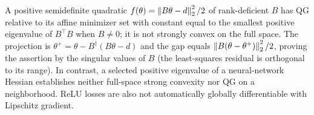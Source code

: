 A positive semidefinite quadratic $f(\theta)=\left\lVert B\theta-d\right\rVert_2^2/2$ of rank-deficient $B$ has QG relative to its affine minimizer set with constant equal to the smallest positive eigenvalue of $B^\top B$ when $B\ne0$; it is not strongly convex on the full space. The projection is $\theta^+=\theta-B^\dagger(B\theta-d)$ and the gap equals $\left\lVert B(\theta-\theta^+)\right\rVert_2^2/2$, proving the assertion by the singular values of $B$ (the least-squares residual is orthogonal to its range). In contrast, a selected positive eigenvalue of a neural-network Hessian establishes neither full-space strong convexity nor QG on a neighborhood. ReLU losses are also not automatically globally differentiable with Lipschitz gradient.
